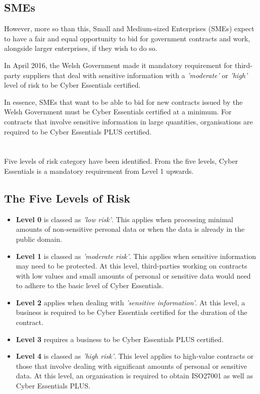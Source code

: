 \documentclass[12pt]{article}
\begin{document}
\subsection*{SMEs}
However, more so than this, Small and Medium-sized Enterprises (SMEs) expect to have a fair and equal opportunity to bid for government contracts and work, alongside larger enterprises, if they wish to do so.

In April 2016, the Welsh Government made it mandatory requirement for third-party suppliers that deal with sensitive information with a \textit{'moderate'} or \textit{'high'} level of risk to be Cyber Essentials certified.

In essence, SMEs that want to be able to bid for new contracts issued by the Welsh Government must be Cyber Essentials certified at a minimum. For contracts that involve sensitive information in large quantities, organisations are required to be Cyber Essentials PLUS certified.


\section*{}
Five levels of risk category have been identified. From the five levels, Cyber Essentials is a mandatory requirement from Level 1 upwards.

\subsection*{The Five Levels of Risk}
\begin{itemize}
  \item \textbf{Level 0} is classed as \textit{'low risk'}. This applies when processing minimal amounts of non-sensitive personal data or when the data is already in the public domain.
  \item \textbf{Level 1} is classed as \textit{'moderate risk'}. This applies when sensitive information may need to be protected. At this level, third-parties working on contracts with low values and small amounts of personal or sensitive data would need to adhere to the basic level of Cyber Essentials.
  \item \textbf{Level 2} applies when dealing with \textit{'sensitive information'}. At this level, a business is required to be Cyber Essentials certified for the duration of the contract.
  \item \textbf{Level 3} requires a business to be Cyber Essentials PLUS certified.
  \item \textbf{Level 4} is classed as \textit{'high risk'}. This level applies to high-value contracts or those that involve dealing with significant amounts of personal or sensitive data. At this level, an organisation is required to obtain ISO27001 as well as Cyber Essentials PLUS.
\end{itemize}
\end{document}

